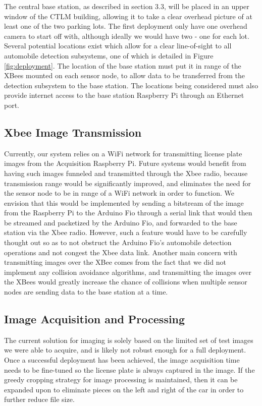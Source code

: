 \documentclass[11pt, oneside, fullpage, doublespace]{article}
\begin{document}
The central base station, as described in section 3.3, will be placed in an upper window of the CTLM building, allowing it to take a clear overhead picture of at least one of the two parking lots. The first deployment only have one overhead camera to start off with, although ideally we would have two - one for each lot. Several potential locations exist which allow for a clear line-of-sight to all automobile detection subsystems, one of which is detailed in Figure \ref{fig:deployment}. The location of the base station must put it in range of the XBees mounted on each sensor node, to allow data to be transferred from the detection subsystem to the base station. The locations being considered must also provide internet access to the base station Raspberry Pi through an Ethernet port.

\subsection{Xbee Image Transmission}
Currently, our system relies on a WiFi network for transmitting license plate images from the Acquisition Raspberry Pi. Future systems would benefit from having such images funneled and transmitted through the Xbee radio, because transmission range would be significantly improved, and eliminates the need for the sensor node to be in range of a WiFi network in order to function. We envision that this would be implemented by sending a bitstream of the image from the Raspberry Pi to the Arduino Fio through a serial link that would then be streamed and packetized by the Arduino Fio, and forwarded to the base station via the Xbee radio. However, such a feature would have to be carefully thought out so as to not obstruct the Arduino Fio's automobile detection operations and not congest the Xbee data link. Another main concern with transmitting images over the XBee comes from the fact that we did not implement any collision avoidance algorithms, and transmitting the images over the XBees would greatly increase the chance of collisions when multiple sensor nodes are sending data to the base station at a time.

\subsection{Image Acquisition and Processing}
The current solution for imaging is solely based on the limited set of test images we were able to acquire, and is likely not robust enough for a full deployment. Once a successful deployment has been achieved, the image acquisition time needs to be fine-tuned so the license plate is always captured in the image. If the greedy cropping strategy for image processing is maintained, then it can be expanded upon to eliminate pieces on the left and right of the car in order to further reduce file size.
\end{document}
